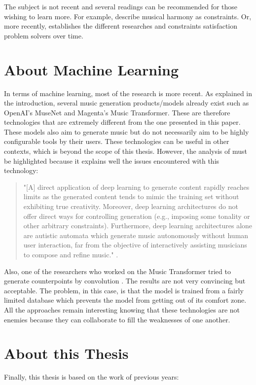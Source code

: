 The subject is not recent and several readings can be recommended for those wishing to learn more. For example, \textcite{pachet2001} describe musical harmony as constraints. Or, more recently, \textcite{sandred2021} establishes the different researches and constraints satisfaction problem solvers over time.

\section*{About Machine Learning}
In terms of machine learning, most of the research is more recent. As explained in the introduction, several music generation products/models already exist such as OpenAI's MuseNet and Magenta's Music Transformer. These are therefore technologies that are extremely different from the one presented in this paper. These models also aim to generate music but do not necessarily aim to be highly configurable tools by their users. These technologies can be useful in other contexts, which is beyond the scope of this thesis. However, the analysis of \citeauthor{briot2020} must be highlighted because it explains well the issues encountered with this technology:
\begin{quote}
    "[A] direct application of deep learning to generate content rapidly reaches limits as the generated content tends to mimic the training set without exhibiting true creativity. Moreover, deep learning architectures do not offer direct ways for controlling generation (e.g., imposing some tonality or other arbitrary constraints). Furthermore, deep learning architectures alone are autistic automata which generate music autonomously without human user interaction, far from the objective of interactively assisting musicians to compose and refine music."
    \textcite{briot2020}.
\end{quote}

Also, one of the researchers who worked on the Music Transformer\parencite{huang2018music} tried to generate counterpoints by convolution \parencite{huang2019counterpoint}. The results are not very convincing but acceptable. The problem, in this case, is that the model is trained from a fairly limited database which prevents the model from getting out of its comfort zone. All the approaches remain interesting knowing that these technologies are not enemies because they can collaborate to fill the weaknesses of one another.

\section*{About this Thesis}
Finally, this thesis is based on the work of previous years:

